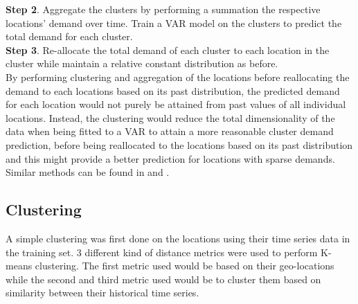 \documentclass[nonblindrev,msom]{informs3} %
\begin{document}
	
	
\noindent \textbf{Step 2}. Aggregate the clusters by performing a summation the respective locations' demand over time. Train a VAR model on the clusters to predict the total demand for each cluster. \\

\noindent \textbf{Step 3}. Re-allocate the total demand of each cluster to each location in the cluster while maintain a relative constant distribution as before. \\







\noindent By performing clustering and aggregation of the locations before reallocating the demand to each locations based on its past distribution, the predicted demand for each location would not purely be attained from past values of all individual locations. Instead, the clustering would reduce the total dimensionality of the data when being fitted to a VAR to attain a more reasonable cluster demand prediction, before being reallocated to the locations based on its past distribution and this might provide a better prediction for locations with sparse demands. Similar methods can be found in \cite{Paul2015} and \cite{Chi2014}.

\noindent 
\subsection{Clustering}

A simple clustering was first done on the locations using their time series data in the training set. 3 different kind of distance metrics were used to perform K-means clustering. The first metric used would be based on their geo-locations while the second and third metric used would be to cluster them based on similarity between their historical time series. 
\end{document}
